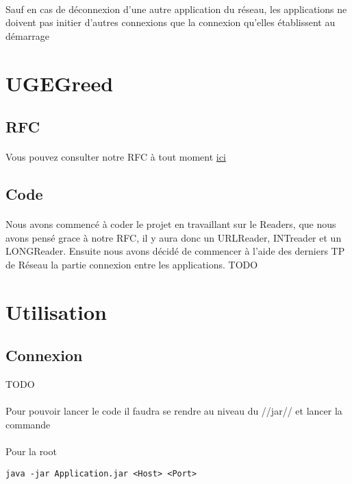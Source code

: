 \documentclass[a4paper,titlepage]{report}
\begin{document}
\paragraph{}
Sauf en cas de déconnexion d'une autre application du réseau, les applications ne doivent pas initier d'autres connexions que la connexion qu'elles établissent au démarrage
\pagebreak
\section{UGEGreed}
\subsection{RFC}
\paragraph{}
Vous pouvez consulter notre RFC à tout moment
\href {https://gitlab.com/Setsulys/ugegreed-debats-ly-ieng/-/blob/main/GreedRfc.md}{ici}
\subsection{Code}
\paragraph{}
Nous avons commencé à coder le projet en travaillant sur le Readers, que nous avons pensé grace à notre RFC, il y aura donc un URLReader, INTreader et un LONGReader. Ensuite nous avons décidé de commencer à l'aide des derniers TP de Réseau la partie connexion entre les applications.
TODO
\section{Utilisation}
\subsection{Connexion}
TODO
\paragraph{}
Pour pouvoir lancer le code il faudra se rendre au niveau du //jar// et lancer la commande 
\paragraph{}
Pour la root
\begin{lstlisting}
java -jar Application.jar <Host> <Port>
\end{lstlisting}
\end{document}
